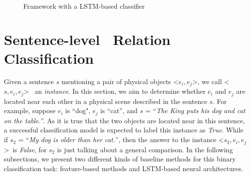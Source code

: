\begin{figure}[t]
	\centering
	\caption{Framework with a LSTM-based classifier}
	\label{fig:LSTM}
\end{figure}

\section{Sentence-level \lnear~Relation Classification}
\label{sec:classify} 
Given a sentence $s$ mentioning a pair of physical objects 
\textless$e_i,e_j$\textgreater, we call \textless$s,e_i,e_j$\textgreater
~an {\em instance}. 
In this section, we aim to 
determine whether $e_i$ and $e_j$ are located near each other in a physical scene described in the sentence $s$.
For example, suppose $e_i$ is ``dog", $e_j$ is ``cat'', and $s$ = ``\textit{The King puts his dog and cat on the table.}''.
As it is true that the two objects are located near in this sentence, a successful classification model is expected to label this instance as \textit{True}.
While if $s_2$ = ``\textit{My dog is older than her cat.}'', then the answer to the instance \textless$s_2,e_i,e_j$\textgreater ~is \textit{False}, for $s_2$ is just talking about a general comparison.
In the following subsections, we present two different kinds of baseline methods for this binary classification task: feature-based methods and LSTM-based neural architectures.

